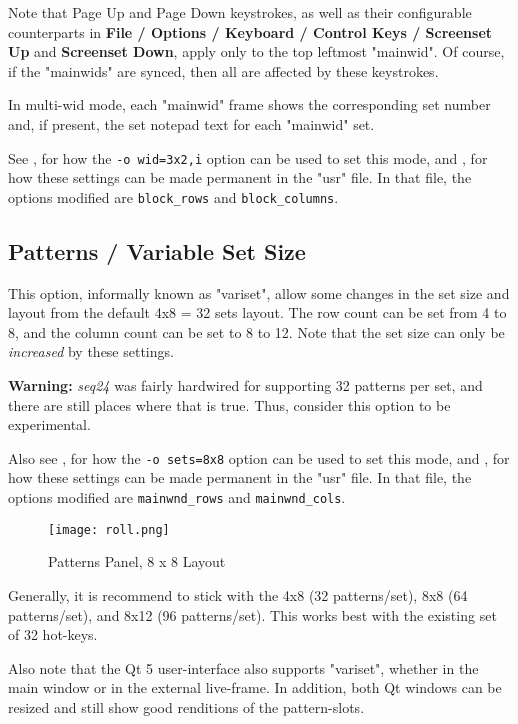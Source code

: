    Note that Page Up and Page Down keystrokes, as well as their
   configurable counterparts in
   \textbf{File / Options / Keyboard / Control Keys / Screenset Up}
   and \textbf{Screenset Down}, apply only to the top leftmost "mainwid".
   Of course, if the "mainwids" are synced, then all are affected by these
   keystrokes.

   In multi-wid mode, each "mainwid" frame shows the corresponding set number
   and, if present, the set notepad text for each "mainwid" set.

   See 
   , for how the
   \texttt{-o wid=3x2,i} option can be used to set this mode, and
   , for
   how these settings can be made permanent in the "usr" file.
   In that file, the options modified are \texttt{block\_rows} and
   \texttt{block\_columns}.

\subsection{Patterns / Variable Set Size}
\label{subsec:patterns_panel_variset}

   This option, informally known as "variset", allow some changes in
   the set size and layout from the default 4x8 = 32 sets layout.
   The row count can be set from 4 to 8, and the column count can be set to 8
   to 12.  Note that the set size can only be \textsl{increased} by these
   settings.

   \textbf{Warning:}
   \textsl{seq24} was fairly hardwired for supporting 32 patterns per
   set, and there are still places where that is true.  Thus,
   consider this option to be experimental.

   Also see 
   , for how the
   \texttt{-o sets=8x8} option can be used to set this mode, and
   , for
   how these settings can be made permanent in the "usr" file.
   In that file, the options modified are \texttt{mainwnd\_rows} and
   \texttt{mainwnd\_cols}.

\begin{figure}[H]
   \centering 
   \texttt{[image: roll.png]}
   \caption{Patterns Panel, 8 x 8 Layout}
   \label{fig:pattern_window_bottom_panel_variset}
\end{figure}

   Generally, it is recommend to stick with the 4x8 (32 patterns/set),
   8x8 (64 patterns/set), and 8x12 (96 patterns/set).  This works best with the
   existing set of 32 hot-keys.

   Also note that the Qt 5 user-interface also supports "variset", whether in
   the main window or in the external live-frame.  In addition, both Qt windows
   can be resized and still show good renditions of the pattern-slots.

